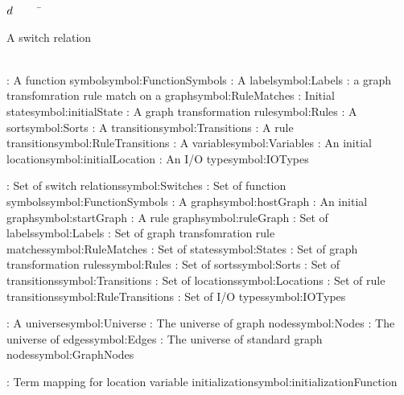 \begin{tabbing}

$d$~~~~~\=\parbox{5in}{A switch relation\dotfill \pageref{symbol:Switches}}\\
\addsymbol \functionSymbol: {A function symbol}{symbol:FunctionSymbols}
\addsymbol \ltsLabel: {A label}{symbol:Labels}
\addsymbol {}: {a graph transfomration rule match on a graph}{symbol:RuleMatches}
\addsymbol \initialState: {Initial state}{symbol:initialState}
\addsymbol \ggrule: {A graph transformation rule}{symbol:Rules}
\addsymbol \sort: {A sort}{symbol:Sorts}
\addsymbol \transition: {A transition}{symbol:Transitions}
\addsymbol {}: {A rule transition}{symbol:RuleTransitions}
\addsymbol \variable: {A variable}{symbol:Variables}
\addsymbol \initialLocation: {An initial location}{symbol:initialLocation}
\addsymbol \iotype: {An I/O type}{symbol:IOTypes}

\addsymbol \Switches: {Set of switch relations}{symbol:Switches}
\addsymbol \FunctionSymbols: {Set of function symbols}{symbol:FunctionSymbols}
\addsymbol \hostGraph: {A graph}{symbol:hostGraph}
\addsymbol \startGraph: {An initial graph}{symbol:startGraph}
\addsymbol {}: {A rule graph}{symbol:ruleGraph}
\addsymbol \Labels: {Set of labels}{symbol:Labels}
\addsymbol \RuleMatches: {Set of graph transfomration rule matches}{symbol:RuleMatches}
\addsymbol \States: {Set of states}{symbol:States}
\addsymbol \Rules: {Set of graph transformation rules}{symbol:Rules}
\addsymbol \Sorts: {Set of sorts}{symbol:Sorts}
\addsymbol \Transitions: {Set of transitions}{symbol:Transitions}
\addsymbol \Locations: {Set of locations}{symbol:Locations}
\addsymbol \RuleTransitions: {Set of rule transitions}{symbol:RuleTransitions}
\addsymbol \IOTypes: {Set of I/O types}{symbol:IOTypes}

\addsymbol {}: {A universe}{symbol:Universe}
\addsymbol \Nodes: {The universe of graph nodes}{symbol:Nodes}
\addsymbol \Edges: {The universe of edges}{symbol:Edges}
\addsymbol \GraphNodes: {The universe of standard graph nodes}{symbol:GraphNodes}

\addsymbol \initializationFunction: {Term mapping for location variable initialization}{symbol:initializationFunction}


\end{tabbing}
